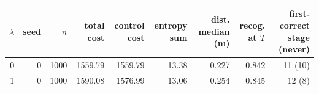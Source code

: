 \begin{tabular}{rrrrrrrrr}
\toprule
$\lambda$ & seed & $n$ & total cost & control cost & entropy sum & dist. median (m) & recog. at $T$ & first-correct stage (never) \\
\midrule
0 & 0 & 1000 & 1559.79 & 1559.79 & 13.38 & 0.227 & 0.842 & 11 (10) \\
1 & 0 & 1000 & 1590.08 & 1576.99 & 13.06 & 0.254 & 0.845 & 12 (8) \\
\bottomrule
\end{tabular}